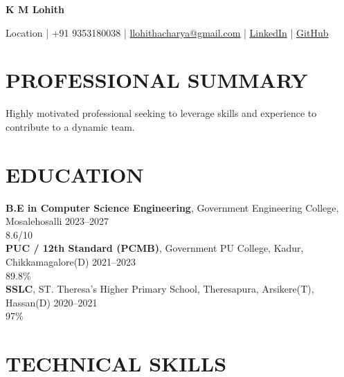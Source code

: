\documentclass[10pt,a4paper]{article}
\begin{document}

\begin{center}

{\LARGE \textbf{K M Lohith}}

\vspace{2pt}

Location |
+91 9353180038 |
\href{mailto:llohithacharya@gmail.com}{llohithacharya@gmail.com} |
\href{https://linkedin.com/in/username}{LinkedIn} |
\href{https://github.com/username}{GitHub}

\end{center}


\section*{PROFESSIONAL SUMMARY}

Highly motivated professional seeking to leverage skills and experience to contribute to a dynamic team.


\section*{EDUCATION}

\noindent \textbf{B.E in Computer Science Engineering}, Government Engineering College, Mosalehosalli \hfill 2023–2027\\
\null \hfill 8.6/10\vspace{5pt}\\
\noindent \textbf{PUC / 12th Standard (PCMB)}, Government PU College, Kadur, Chikkamagalore(D) \hfill 2021–2023\\
\null \hfill 89.8\%\vspace{5pt}\\
\noindent \textbf{SSLC}, ST. Theresa’s Higher Primary School, Theresapura, Arsikere(T), Hassan(D) \hfill 2020–2021\\
\null \hfill 97\%\vspace{5pt}\\



\section*{TECHNICAL SKILLS}
\end{document}
